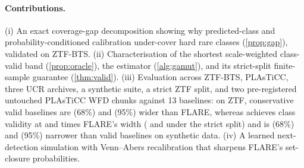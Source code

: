 \paragraph{Contributions.}
(i) An exact coverage-gap decomposition showing why predicted-class and probability-conditioned calibration under-cover hard rare classes (\cref{prop:gap}), validated on ZTF-BTS.
(ii) Characterisation of the shortest scale-weighted class-valid band (\cref{prop:oracle}), the \gamut{} estimator (\cref{alg:gamut}), and its strict-split finite-sample guarantee (\cref{thm:valid}).
(iii) Evaluation across ZTF-BTS, PLAsTiCC, three UCR archives, a synthetic suite, a strict ZTF split, and two pre-registered untouched PLAsTiCC WFD chunks against 13 baselines: on ZTF, conservative valid baselines are \ZTFValidOverFlareSixtyeight{} (68\%) and \ZTFValidOverFlareNinetyfive{} (95\%) wider than FLARE, whereas \gamut{} achieves class validity at \ZTFWidthRatioSixtyeight{} and \ZTFWidthRatioNinetyfive{} times FLARE's width (\StrictWidthGamutSixtyeight{} and \StrictWidthGamutNinetyfive{} under the strict split) and is \SynValidOverGamutSixtyeight{} (68\%) and \SynValidOverGamutNinetyfive{} (95\%) narrower than valid baselines on synthetic data.
(iv) A learned next-detection simulation with Venn--Abers recalibration that sharpens FLARE's set-closure probabilities.
